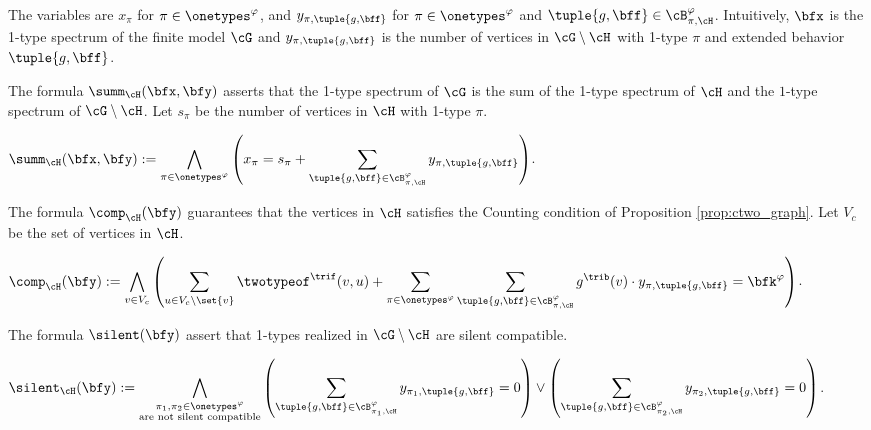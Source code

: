 \begin{compactitem}
    \item The variables are $x_\pi$ for $\pi \in \onetypes^\varphi$,
    and $y_{\pi, \tuple{g, \bff}}$ for $\pi \in \onetypes^\varphi$ and $\tuple{g, \bff} \in \cB^\varphi_{\pi, \cH}$.
    Intuitively, $\bfx$ is the 1-type spectrum of the finite model $\cG$ and $y_{\pi, \tuple{g, \bff}}$ is the number of vertices in $\cG \setminus \cH$ with 1-type $\pi$ and extended behavior $\tuple{g, \bff}$.
    \item
    The formula $\summ_{\cH}(\bfx, \bfy)$ asserts that the 1-type spectrum of $\cG$ is the sum of the 1-type spectrum of $\cH$ and 
    the $1$-type spectrum of $\cG \setminus \cH$.
    Let $s_\pi$ be the number of vertices in $\cH$ with 1-type $\pi$. \\
    \begin{notsotiny}
    $\displaystyle\summ_{\cH}(\bfx, \bfy)
         := 
     \bigwedge_{\pi \in \onetypes^\varphi} \left(x_\pi = s_\pi + \sum_{\tuple{g, \bff} \in \cB^{\varphi}_{\pi, \cH}} y_{\pi, \tuple{g, \bff}}\right)$.
    \end{notsotiny}
    \item
    The formula $\comp_{\cH}(\bfy)$ guarantees that the vertices in $\cH$ satisfies the Counting condition of Proposition \ref{prop:ctwo_graph}.
    Let $V_c$ be the set of vertices in $\cH$. \\
    \begin{notsotiny}
    $\displaystyle\comp_{\cH}(\bfy)
         := 
        \bigwedge_{v \in V_c} \left(
            \sum_{u \in V_c \setminus \set{v}} \twotypeof^\trif(v, u) +
            \sum_{\pi \in \onetypes^\varphi} \sum_{\tuple{g, \bff} \in \cB^{\varphi}_{\pi, \cH}} g^\trib(v) \cdot y_{\pi, \tuple{g, \bff}}
        = \bfk^\varphi \right)$.
        \end{notsotiny}
    \item
    The formula $\silent(\bfy)$ assert that 1-types realized in $\cG \setminus \cH$ are silent compatible. \\
    \begin{notsotiny}
    $\displaystyle\silent_{\cH}(\bfy)
         := 
        \bigwedge_{\substack{\pi_1, \pi_2 \in \onetypes^\varphi \\ \text{are not silent compatible}}}
        \left(\sum_{\tuple{g, \bff} \in \cB^{\varphi}_{\pi_1, \cH}} y_{\pi_1, \tuple{g, \bff}} = 0\right) \lor
        \left(\sum_{\tuple{g, \bff} \in \cB^{\varphi}_{\pi_2, \cH}} y_{\pi_2, \tuple{g, \bff}} = 0\right)$.
        \end{notsotiny}

\end{compactitem}
